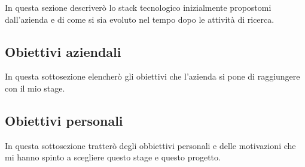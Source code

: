 In questa sezione descriverò lo stack tecnologico inizialmente propostomi dall'azienda e di come si sia evoluto nel tempo dopo le attività di ricerca.

\subsection{Obiettivi aziendali}

In questa sottosezione elencherò gli obiettivi che l'azienda si pone di raggiungere con il mio stage.

\subsection{Obiettivi personali}

In questa sottosezione tratterò degli obbiettivi personali e delle motivazioni che mi hanno spinto a scegliere questo stage e questo progetto.



